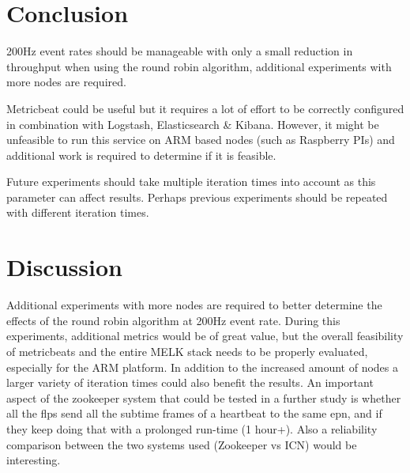 \documentclass[]{article}
\begin{document}
\section{Conclusion}
200Hz event rates should be manageable with only a small reduction in throughput when using the round robin algorithm, additional experiments with more nodes are required.

Metricbeat could be useful but it requires a lot of effort to be correctly configured in combination with Logstash, Elasticsearch \& Kibana. However, it might be unfeasible to run this service on ARM based nodes (such as Raspberry PIs) and additional work is required to determine if it is feasible.

Future experiments should take multiple iteration times into account as this parameter can affect results. Perhaps previous experiments should be repeated with different iteration times.

\section{Discussion}
Additional experiments with more nodes are required to better determine the effects of the round robin algorithm at 200Hz event rate. During this experiments, additional metrics would be of great value, but the overall feasibility of metricbeats and the entire MELK stack needs to be properly evaluated, especially for the ARM platform. In addition to the increased amount of nodes a larger variety of iteration times could also benefit the results.
An important aspect of the zookeeper system that could be tested in a further study is whether all the flps send all the subtime frames of a heartbeat to the same epn, and if they keep doing that with a prolonged run-time (1 hour+). Also a reliability comparison between the two systems used (Zookeeper vs ICN) would be interesting.



\end{document}
